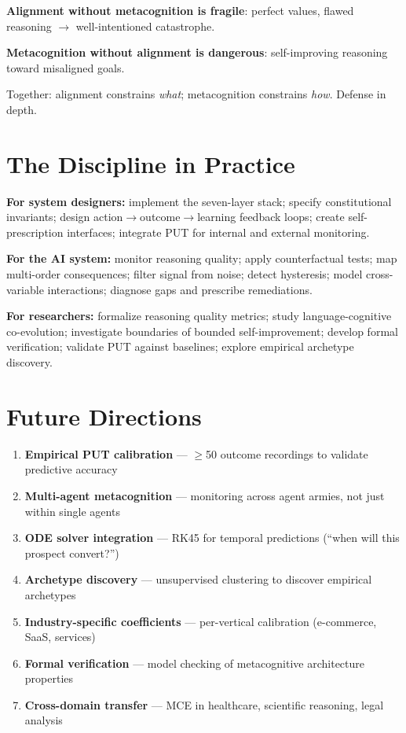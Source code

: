 \documentclass[12pt,a4paper]{article}
\theoremstyle{plain}
\theoremstyle{definition}
\theoremstyle{remark}
\begin{document}
\textbf{Alignment without metacognition is fragile}: perfect values, flawed reasoning $\to$ well-intentioned catastrophe.

\textbf{Metacognition without alignment is dangerous}: self-improving reasoning toward misaligned goals.

Together: alignment constrains \emph{what}; metacognition constrains \emph{how}. Defense in depth.

\section{The Discipline in Practice}

\textbf{For system designers:} implement the seven-layer stack; specify constitutional invariants; design action$\to$outcome$\to$learning feedback loops; create self-prescription interfaces; integrate PUT for internal and external monitoring.

\textbf{For the AI system:} monitor reasoning quality; apply counterfactual tests; map multi-order consequences; filter signal from noise; detect hysteresis; model cross-variable interactions; diagnose gaps and prescribe remediations.

\textbf{For researchers:} formalize reasoning quality metrics; study language-cognitive co-evolution; investigate boundaries of bounded self-improvement; develop formal verification; validate PUT against baselines; explore empirical archetype discovery.

\section{Future Directions}

\begin{enumerate}[nosep]
\item \textbf{Empirical PUT calibration} --- $\geq$50 outcome recordings to validate predictive accuracy
\item \textbf{Multi-agent metacognition} --- monitoring across agent armies, not just within single agents
\item \textbf{ODE solver integration} --- RK45 for temporal predictions (``when will this prospect convert?'')
\item \textbf{Archetype discovery} --- unsupervised clustering to discover empirical archetypes
\item \textbf{Industry-specific coefficients} --- per-vertical calibration (e-commerce, SaaS, services)
\item \textbf{Formal verification} --- model checking of metacognitive architecture properties
\item \textbf{Cross-domain transfer} --- MCE in healthcare, scientific reasoning, legal analysis
\end{enumerate}
\end{document}
